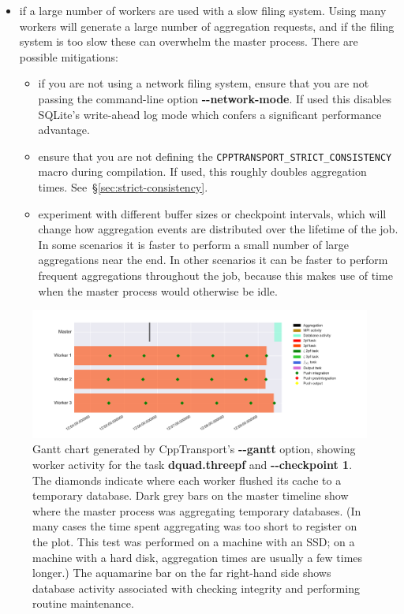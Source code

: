 \documentclass[11pt,a4paper]{article}
\newcommand{\repoobject}[1]{{\ttfamily\bfseries\small #1}}
\newcommand{\packagefont}{\sffamily}
\newcommand{\CppTransport}{{\packagefont CppTransport}}
\newcommand{\SQLite}{{\packagefont SQLite}}
\newcommand{\option}[1]{{\ttfamily\bfseries\small #1}}
\begin{document}
\begin{itemize}
    \item if a large number of workers are used with a slow filing system.
    Using many workers will generate a large number of aggregation requests,
    and if the filing system is too slow these can overwhelm the master process.
    There are possible mitigations:
    \begin{itemize}
        \item if you are not using a network filing system, ensure that
        you are not passing the command-line option
        \option{{-}{-}network-mode}.
        If used this disables {\SQLite}'s write-ahead log mode which confers
        a significant performance advantage.
        
        \item ensure that you are not defining the
        \texttt{CPPTRANSPORT_STRICT_CONSISTENCY} macro during compilation.
        If used, this roughly doubles aggregation times.
        See~\S\ref{sec:strict-consistency}.
        
        \item experiment with different buffer sizes or checkpoint intervals,
        which will change how aggregation events
        are distributed over the lifetime of the job.
        In some scenarios it is faster to perform a small number of large aggregations
        near the end.
        In other scenarios it can be faster to perform frequent aggregations
        throughout the job, because this makes use of time when the master
        process would otherwise be idle.
    \end{itemize}
\end{itemize}
\begin{figure}
    \begin{center}
        \includegraphics[scale=0.5]{Outputs/gantt}    
    \end{center}
    \caption{\label{fig:gantt}Gantt chart
    generated by {\CppTransport}'s \option{{-}{-}gantt} option,
    showing worker activity
    for the task \repoobject{dquad.threepf}
    and \option{{-}{-}checkpoint 1}.
    The diamonds indicate where each worker flushed its cache
    to a temporary database.
    Dark grey bars on the master timeline show where the
    master process was aggregating temporary databases.
    (In many cases the time spent aggregating was too short to register
    on the plot. This test was performed on a machine with an SSD; on
    a machine with a hard disk, aggregation times are usually a few times longer.)
    The aquamarine bar on the far right-hand side
    shows database activity associated
    with checking integrity and performing routine maintenance.}
\end{figure}
\end{document}
